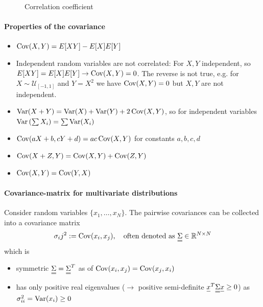 
\begin{figure}[!htb]
    \centering
    
    \caption{Correlation coefficient}
    \label{fig:corr_coef}
\end{figure}

\paragraph*{Properties of the covariance}
\begin{itemize}
    \item $\operatorname{Cov}(X,Y) = E[XY] - E[X]E[Y]$
    \item \textcolor{blue1}{Independent random variables are not correlated:} For $X,Y$ independent, so
    $E[XY] = E[X]E[Y] \rightarrow \operatorname{Cov}(X,Y) = 0$. \textcolor{red1}{The reverse is not true}, e.g. for
    $X \sim \mathcal{U}_{[-1,1]}$ and $Y = X^2$ we have $\operatorname{Cov}(X,Y) = 0$ but $X,Y$ are not independent.
    \item $\operatorname{Var}(X+Y) = \operatorname{Var}(X) + \operatorname{Var}(Y) + 2\operatorname{Cov}(X,Y)$, so for independent variables $\operatorname{Var}\left( \sum X_i \right) = \sum \operatorname{Var}(X_i)$
    \item $\operatorname{Cov}(aX+b, cY+d) = ac\operatorname{Cov}(X,Y)$ for constants $a,b,c,d$
    \item $\operatorname{Cov}(X+Z,Y) = \operatorname{Cov}(X,Y) + \operatorname{Cov}(Z,Y)$
    \item $\operatorname{Cov}(X,Y) = \operatorname{Cov}(Y,X)$
\end{itemize}

\paragraph*{Covariance-matrix for multivariate distributions}
Consider random variables $\{x_1,\dots,x_N\}$. The pairwise covariances
can be collected into a covariance matrix
\begin{equation}
    \sigma_ij^2 := \Cov(x_i,x_j), \quad \text{often denoted as } \mat{\Sigma} \in \mathbb{R}^{N \times N}
\end{equation}
which is
\begin{itemize}
    \item symmetric $\mat{\Sigma} = \mat{\Sigma}^T$ as of $\operatorname{Cov}(x_i,x_j) = \operatorname{Cov}(x_j,x_i)$
    \item has only positive real eigenvalues ($\rightarrow$ positive semi-definite $\vec{x}^T \mat{\Sigma} \vec{x} \geq 0$) as $\sigma_{ii}^2 = \operatorname{Var}(x_i) \geq 0$
\end{itemize}

